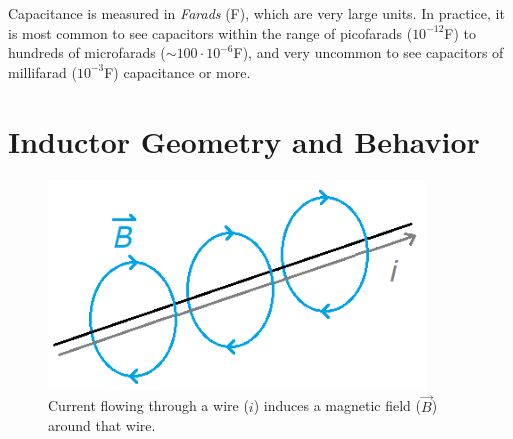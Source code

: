 \par
Capacitance is measured in \textit{Farads} (F), which are very large units. In practice, it is most common to see capacitors within the range of picofarads ($10^{-12}$F) to hundreds of microfarads ($\sim100 \cdot 10^{-6}$F), and very uncommon to see capacitors of millifarad ($10^{-3}$F) capacitance or more.

\section{Inductor Geometry and Behavior}
\begin{figure}[h!]
\centering
\includegraphics[width=10cm]{figures/magneticFieldInduction.png}
\caption{Current flowing through a wire ($i$) induces a magnetic field ($\vec{B}$) around that wire.}
\label{magneticFieldAroundWire}
\end{figure}

